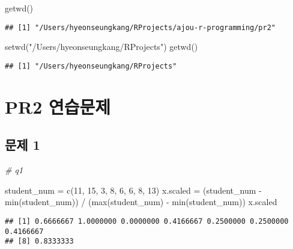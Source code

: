\documentclass[
]{article}
\newenvironment{Shaded}{\begin{snugshade}}{\end{snugshade}}
\newcommand{\CommentTok}[1]{\textcolor[rgb]{0.56,0.35,0.01}{\textit{#1}}}
\newcommand{\DecValTok}[1]{\textcolor[rgb]{0.00,0.00,0.81}{#1}}
\newcommand{\FunctionTok}[1]{\textcolor[rgb]{0.00,0.00,0.00}{#1}}
\newcommand{\NormalTok}[1]{#1}
\newcommand{\OtherTok}[1]{\textcolor[rgb]{0.56,0.35,0.01}{#1}}
\newcommand{\SpecialCharTok}[1]{\textcolor[rgb]{0.00,0.00,0.00}{#1}}
\newcommand{\StringTok}[1]{\textcolor[rgb]{0.31,0.60,0.02}{#1}}
\begin{document}
\begin{Shaded}
\begin{Highlighting}[]
\FunctionTok{getwd}\NormalTok{()}
\end{Highlighting}
\end{Shaded}

\begin{verbatim}
## [1] "/Users/hyeonseungkang/RProjects/ajou-r-programming/pr2"
\end{verbatim}

\begin{Shaded}
\begin{Highlighting}[]
\FunctionTok{setwd}\NormalTok{(}\StringTok{"/Users/hyeonseungkang/RProjects"}\NormalTok{)}
\FunctionTok{getwd}\NormalTok{()}
\end{Highlighting}
\end{Shaded}

\begin{verbatim}
## [1] "/Users/hyeonseungkang/RProjects"
\end{verbatim}

\hypertarget{pr2-uxc5f0uxc2b5uxbb38uxc81c}{%
\section{PR2 연습문제}\label{pr2-uxc5f0uxc2b5uxbb38uxc81c}}

\hypertarget{uxbb38uxc81c-1}{%
\subsection{문제 1}\label{uxbb38uxc81c-1}}

\begin{Shaded}
\begin{Highlighting}[]
\CommentTok{\# q1}

\NormalTok{student\_num }\OtherTok{=} \FunctionTok{c}\NormalTok{(}\DecValTok{11}\NormalTok{, }\DecValTok{15}\NormalTok{, }\DecValTok{3}\NormalTok{, }\DecValTok{8}\NormalTok{, }\DecValTok{6}\NormalTok{, }\DecValTok{6}\NormalTok{, }\DecValTok{8}\NormalTok{, }\DecValTok{13}\NormalTok{)}
\NormalTok{x.scaled }\OtherTok{=}\NormalTok{ (student\_num }\SpecialCharTok{{-}} \FunctionTok{min}\NormalTok{(student\_num)) }\SpecialCharTok{/}\NormalTok{ (}\FunctionTok{max}\NormalTok{(student\_num) }\SpecialCharTok{{-}} \FunctionTok{min}\NormalTok{(student\_num))}
\NormalTok{x.scaled}
\end{Highlighting}
\end{Shaded}

\begin{verbatim}
## [1] 0.6666667 1.0000000 0.0000000 0.4166667 0.2500000 0.2500000 0.4166667
## [8] 0.8333333
\end{verbatim}
\end{document}
